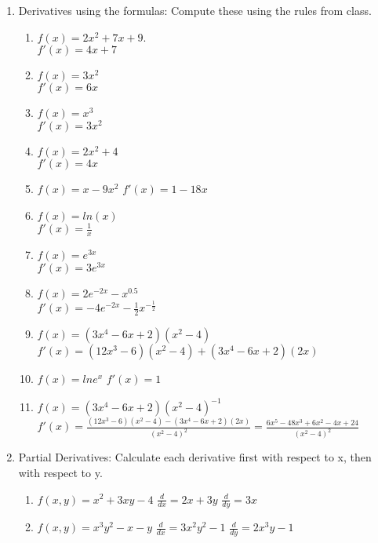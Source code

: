 \documentclass[11pt]{article}
\begin{document}
\begin{enumerate}
\item Derivatives using the formulas: Compute these using the rules from class. 
\begin{enumerate}
\item $f(x) = 2x^2 + 7x + 9$. \\
\color{gray} $f'(x)=4x+7$ \color{black} 
\item $f(x) = 3x^2$ \\
\color{gray} $f'(x)=6x$ \color{black}
\item  $f(x) =x^3$ \\
\color{gray} $f'(x)=3x^2$ \color{black}
\item  $f(x) =2x^2+4$ \\
\color{gray} $f'(x)=4x$ \color{black}
\item  $f(x) =x-9x^2$
\color{gray} $f'(x)=1-18x$ \color{black}
\item  $f(x)=ln(x)$\\
\color{gray} $f'(x)=\frac{1}{x}$ \color{black}
\item $f(x)=e^{3x}$ \\
\color{gray} $f'(x)=3e^{3x}$ \color{black}
\item $f(x)=2e^{-2x}-x^{0.5}$ \\
\color{gray} $f'(x)=-4e^{-2x}-\frac{1}{2}x^{-{\frac{1}{2}}}$ \color{black}
\item $f(x)=(3x^4-6x+2)(x^2-4)$ \\
\color{gray} $f'(x)=(12x^3-6)(x^2-4)+(3x^4-6x+2)(2x)    $ \color{black}
\item $f(x)=ln{e^x}$
\color{gray} $f'(x)=1 $ \color{black}
\item $f(x)=(3x^4-6x+2)(x^2-4)^{-1}$
\color{gray} $f'(x)=\frac{(12x^3-6)(x^2-4)-(3x^4-6x+2)(2x)}{(x^2-4)^2}=\frac{6x^5-48x^3+6x^2-4x+24}{(x^2-4)^2} $ \color{black}
\end{enumerate}


\item Partial Derivatives: Calculate each derivative first with respect to x, then with respect to y. 
\begin{enumerate}
\item $f(x,y)=x^2+3xy-4$  \color{gray} $\frac{d}{dx}=2x+3y$ $\frac{d}{dy}=3x$ \color{black}
\item $f(x,y)=x^3y^2-x-y$ \color{gray} $\frac{d}{dx}=3x^2y^2-1$ $\frac{d}{dy}=2x^3y-1$ \color{black}
\end{enumerate}

\end{enumerate}
\end{document}
